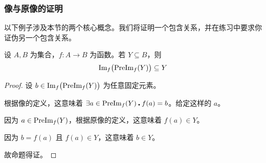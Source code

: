 \subsubsection*{像与原像的证明}

以下例子涉及本节的两个核心概念。我们将证明一个包含关系，并在练习中要求你证伪另一个包含关系。

\begin{proposition}\label{prop:proposition7.3.12}
    设 $A,B$ 为集合，$f:A \to B$ 为函数。若 $Y \subseteq B$，则
    \[\text{Im}_f \big(\text{PreIm}_f (Y)\big) \subseteq Y\]
\end{proposition}

\begin{proof}
    设 $b \in \text{Im}_f \big(\text{PreIm}_f (Y)\big)$ 为任意固定元素。

    根据像的定义，这意味着 $\exists a \in \text{PreIm}_f (Y) \centerdot f(a) = b$。给定这样的 $a$。

    因为 $a \in \text{PreIm}_f (Y)$，根据原像的定义，这意味着 $f(a) \in Y$。

    因为 $b = f(a)$ 且 $f(a) \in Y$，这意味着 $b \in Y$。

    故命题得证。
\end{proof}
